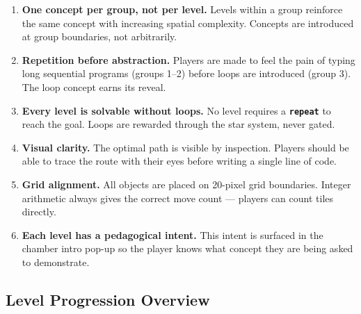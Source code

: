 \documentclass[12pt,a4paper]{article}
\newcommand{\keyword}[1]{\textcolor{keyword}{\texttt{\bfseries #1}}}
\begin{document}
\begin{tcolorbox}[gddbox, title={Level Design Philosophy}]
\begin{enumerate}[label=\textbf{P\arabic*.}, leftmargin=3em, noitemsep]
  \item \textbf{One concept per group, not per level.} Levels within a group reinforce the same concept with increasing spatial complexity. Concepts are introduced at group boundaries, not arbitrarily.
  \item \textbf{Repetition before abstraction.} Players are made to feel the pain of typing long sequential programs (groups 1--2) before loops are introduced (group 3). The loop concept earns its reveal.
  \item \textbf{Every level is solvable without loops.} No level requires a \keyword{repeat} to reach the goal. Loops are rewarded through the star system, never gated.
  \item \textbf{Visual clarity.} The optimal path is visible by inspection. Players should be able to trace the route with their eyes before writing a single line of code.
  \item \textbf{Grid alignment.} All objects are placed on 20-pixel grid boundaries. Integer arithmetic always gives the correct move count — players can count tiles directly.
  \item \textbf{Each level has a pedagogical intent.} This intent is surfaced in the chamber intro pop-up so the player knows what concept they are being asked to demonstrate.
\end{enumerate}
\end{tcolorbox}

\subsection{Level Progression Overview}
\end{document}
